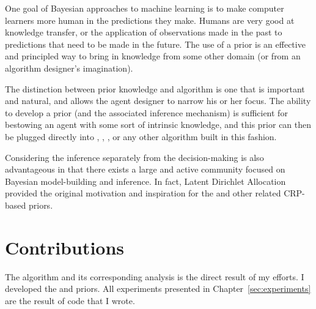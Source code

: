 
One goal of Bayesian approaches to machine learning is to make computer learners more human in the predictions they make. Humans are very good at knowledge transfer, or the application of observations made in the past to predictions that need to be made in the future. The use of a prior is an effective and principled way to bring in knowledge from some other domain (or from an algorithm designer's imagination).

The distinction between prior knowledge and algorithm is one that is important and natural, and allows the agent designer to narrow his or her focus. The ability to develop a prior (and the associated inference mechanism) is sufficient for bestowing an agent with some sort of intrinsic knowledge, and this prior can then be plugged directly into , , , or any other algorithm built in this fashion.

Considering the inference separately from the decision-making is also advantageous in that there exists a large and active community focused on Bayesian model-building and inference. In fact, Latent  Dirichlet Allocation~\cite{blei2003latent} provided the original motivation and inspiration for the  and other related CRP-based priors.

\section{Contributions}

The  algorithm and its corresponding analysis is the direct result of my efforts. I developed the  and  priors. All experiments presented in Chapter~\ref{sec:experiments} are the result of code that I wrote.

